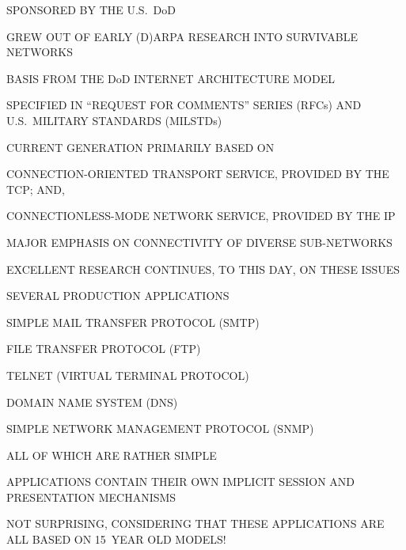 \begin{bwslide}

\begin{nrtc}
\item	SPONSORED BY THE U.S.~DoD
    \begin{nrtc}
    \item	GREW OUT OF EARLY (D)ARPA RESEARCH INTO SURVIVABLE NETWORKS
    \end{nrtc}
    BASIS FROM THE DoD INTERNET ARCHITECTURE MODEL

\item	SPECIFIED IN ``REQUEST FOR COMMENTS'' SERIES (RFCs) AND
	U.S.~MILITARY STANDARDS (MILSTDs)

\item	CURRENT GENERATION PRIMARILY BASED ON
    \begin{nrtc}
    \item	CONNECTION-ORIENTED TRANSPORT SERVICE,
		PROVIDED BY THE TCP; AND,

    \item	CONNECTIONLESS-MODE NETWORK SERVICE,
		PROVIDED BY THE IP
    \end{nrtc}

\item	MAJOR EMPHASIS ON CONNECTIVITY OF DIVERSE SUB-NETWORKS
    \begin{nrtc}
    \item	EXCELLENT RESEARCH CONTINUES, TO THIS DAY, ON THESE ISSUES
    \end{nrtc}
\end{nrtc}
\end{bwslide}


\begin{bwslide}

\begin{nrtc}
\item	SEVERAL PRODUCTION APPLICATIONS
    \begin{nrtc}
    \item	SIMPLE MAIL TRANSFER PROTOCOL (SMTP)

    \item	FILE TRANSFER PROTOCOL (FTP)

    \item	TELNET (VIRTUAL TERMINAL PROTOCOL)

    \item	DOMAIN NAME SYSTEM (DNS)

    \item	SIMPLE NETWORK MANAGEMENT PROTOCOL (SNMP)
    \end{nrtc}
    ALL OF WHICH ARE RATHER SIMPLE

\item	APPLICATIONS CONTAIN THEIR OWN IMPLICIT SESSION AND PRESENTATION
	MECHANISMS

\item	NOT SURPRISING, CONSIDERING THAT THESE APPLICATIONS ARE ALL BASED ON
	15~YEAR OLD MODELS!
\end{nrtc}
\end{bwslide}


